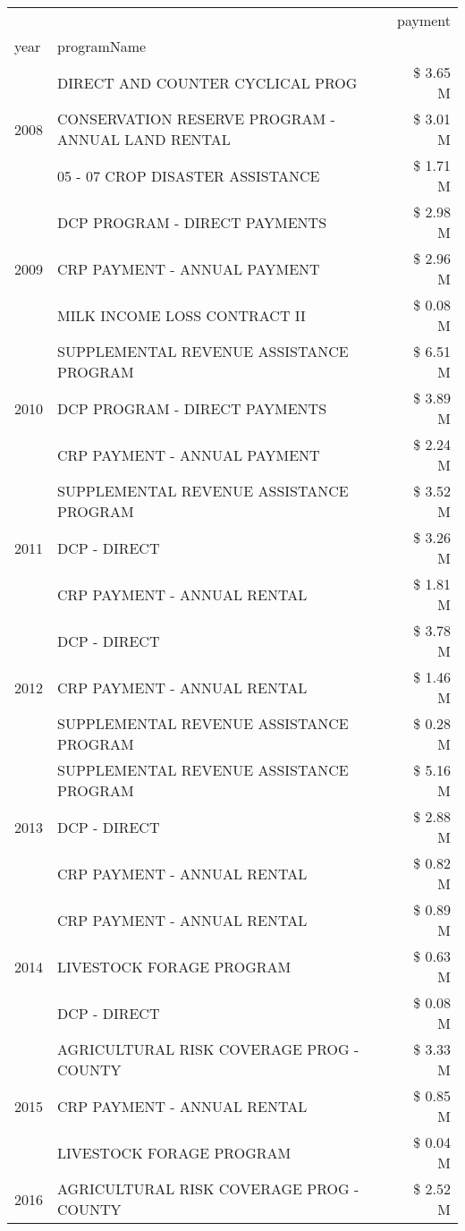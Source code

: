 \begin{tabular}{llr}
\toprule
 &  & payment \\
year & programName &  \\
\midrule
\multirow[t]{3}{*}{2008} & DIRECT AND COUNTER CYCLICAL PROG & \$ 3.65 M \\
 & CONSERVATION RESERVE PROGRAM - ANNUAL LAND RENTAL & \$ 3.01 M \\
 & 05 - 07 CROP DISASTER ASSISTANCE & \$ 1.71 M \\
\cline{1-3}
\multirow[t]{3}{*}{2009} & DCP PROGRAM - DIRECT PAYMENTS & \$ 2.98 M \\
 & CRP PAYMENT - ANNUAL PAYMENT & \$ 2.96 M \\
 & MILK INCOME LOSS CONTRACT II & \$ 0.08 M \\
\cline{1-3}
\multirow[t]{3}{*}{2010} & SUPPLEMENTAL REVENUE ASSISTANCE PROGRAM & \$ 6.51 M \\
 & DCP PROGRAM - DIRECT PAYMENTS & \$ 3.89 M \\
 & CRP PAYMENT - ANNUAL PAYMENT & \$ 2.24 M \\
\cline{1-3}
\multirow[t]{3}{*}{2011} & SUPPLEMENTAL REVENUE ASSISTANCE PROGRAM & \$ 3.52 M \\
 & DCP - DIRECT & \$ 3.26 M \\
 & CRP PAYMENT - ANNUAL RENTAL & \$ 1.81 M \\
\cline{1-3}
\multirow[t]{3}{*}{2012} & DCP - DIRECT & \$ 3.78 M \\
 & CRP PAYMENT - ANNUAL RENTAL & \$ 1.46 M \\
 & SUPPLEMENTAL REVENUE ASSISTANCE PROGRAM & \$ 0.28 M \\
\cline{1-3}
\multirow[t]{3}{*}{2013} & SUPPLEMENTAL REVENUE ASSISTANCE PROGRAM & \$ 5.16 M \\
 & DCP - DIRECT & \$ 2.88 M \\
 & CRP PAYMENT - ANNUAL RENTAL & \$ 0.82 M \\
\cline{1-3}
\multirow[t]{3}{*}{2014} & CRP PAYMENT - ANNUAL RENTAL & \$ 0.89 M \\
 & LIVESTOCK FORAGE PROGRAM & \$ 0.63 M \\
 & DCP - DIRECT & \$ 0.08 M \\
\cline{1-3}
\multirow[t]{3}{*}{2015} & AGRICULTURAL RISK COVERAGE PROG - COUNTY & \$ 3.33 M \\
 & CRP PAYMENT - ANNUAL RENTAL & \$ 0.85 M \\
 & LIVESTOCK FORAGE PROGRAM & \$ 0.04 M \\
\cline{1-3}
\multirow[t]{3}{*}{2016} & AGRICULTURAL RISK COVERAGE PROG - COUNTY & \$ 2.52 M \\

\end{tabular}
